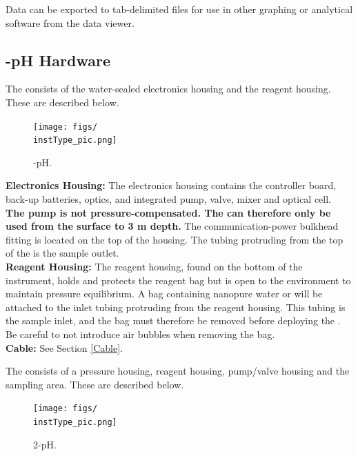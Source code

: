 Data can be exported to tab-delimited files for use in other graphing or analytical software from the data viewer.


\subsection{\instType{}-pH Hardware}

\ifcase \inst	%
    The \instType{} consists of the water-sealed electronics housing and the reagent housing.  These are described below.

    \begin{figure}
    \centering
       \texttt{[image: figs/\\instType\_pic.png]}
    \caption{\instType{}-pH.}
    \label{fig:\instType{}pH}
    \end{figure}
    
        \textbf{Electronics Housing:} The electronics housing contains the controller board, back-up batteries, optics, and integrated pump, valve, mixer and optical cell. \textbf{The \instType{} pump is not pressure-compensated. The \instType{} can therefore only be used from the surface to 3 m depth.} The communication-power bulkhead fitting is located on the top of the housing. The tubing protruding from the top of the \instType{} is the sample outlet.\\
    
    \textbf{Reagent Housing:} The reagent housing, found on the bottom of the instrument, holds and protects the reagent bag but is open to the environment to maintain pressure equilibrium. A bag containing nanopure water or  will be attached to the inlet tubing protruding from the reagent housing. This tubing is the sample inlet, and the bag must therefore be removed before deploying the \instType{}. Be careful to not introduce air bubbles when removing the bag.\\
    
    \textbf{Cable:} See Section \ref{Cable}.

\or			%
    The \instType{} consists of a pressure housing, reagent housing, pump/valve housing and the sampling area.  These are described below.

    \begin{figure}
    \centering
       \texttt{[image: figs/\\instType\_pic.png]}
    \caption{\instType{}2-pH.}
    \label{fig:\instType{}pH}
    \end{figure}
    
